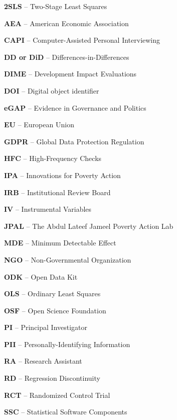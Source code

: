 \noindent\textbf{2SLS} -- Two-Stage Least Squares

\noindent\textbf{AEA} -- American Economic Association

\noindent\textbf{CAPI} -- Computer-Assisted Personal Interviewing

\noindent\textbf{DD or DiD} -- Differences-in-Differences

\noindent\textbf{DIME} -- Development Impact Evaluations

\noindent\textbf{DOI} -- Digital object identifier

\noindent\textbf{eGAP} -- Evidence in Governance and Politics

\noindent\textbf{EU} -- European Union

\noindent\textbf{GDPR} -- Global Data Protection Regulation

\noindent\textbf{HFC} -- High-Frequency Checks

\noindent\textbf{IPA} -- Innovations for Poverty Action

\noindent\textbf{IRB} -- Institutional Review Board

\noindent\textbf{IV} -- Instrumental Variables

\noindent\textbf{JPAL} -- The Abdul Lateef Jameel Poverty Action Lab

\noindent\textbf{MDE} -- Minimum Detectable Effect

\noindent\textbf{NGO} -- Non-Governmental Organization

\noindent\textbf{ODK} -- Open Data Kit

\noindent\textbf{OLS} -- Ordinary Least Squares

\noindent\textbf{OSF} -- Open Science Foundation

\noindent\textbf{PI} -- Principal Investigator

\noindent\textbf{PII} -- Personally-Identifying Information

\noindent\textbf{RA} -- Research Assistant

\noindent\textbf{RD} -- Regression Discontinuity

\noindent\textbf{RCT} -- Randomized Control Trial

\noindent\textbf{SSC} -- Statistical Software Components
